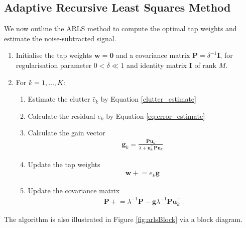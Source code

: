 \documentclass[pra,superscriptaddress,reprint,amsmath,amssymb,nofootinbib]{revtex4-2}
\begin{document}
\subsection{Adaptive Recursive Least Squares Method}
\label{sec:ARLS}
We now outline the ARLS method to compute the optimal tap weights and estimate the noise-subtracted signal. 
\begin{enumerate}
	\item Initialise the tap weights $\mathbf{w} = \mathbf{0}$ and a covariance matrix $\mathbf{P}= \delta^{-1} \mathbf{I}$, for regularisation parameter $0 < \delta \ll 1$  and identity matrix $\mathbf{I}$ of rank $M$.
	\item For $k=1, \dots, K$:
	
	\begin{enumerate}
		\item Estimate the clutter $\hat{c}_k$ by Equation \ref{clutter_estimate}
		\item Calculate the residual $e_k$ by Equation \ref{eq:error_estimate}
		\item Calculate the gain vector
		\begin{eqnarray}
			\mathbf{g}_k = \frac{\mathbf{P} \mathbf{u}_k}{\lambda + \mathbf{u}_k^{\intercal}\mathbf{P} \mathbf{u}_k}
		\end{eqnarray}
	\item Update the tap weights
			\begin{eqnarray}
		\mathbf{w} \mathrel{+}=  e_k \mathbf{g} 
	\end{eqnarray}
	\item Update the covariance matrix
\begin{eqnarray}
	\mathbf{P} \mathrel{+}= \lambda^{-1} \mathbf{P} - \mathbf{g} \lambda^{-1} \mathbf{P} \mathbf{u}_k^{\intercal} 
\end{eqnarray}

	\end{enumerate}

\end{enumerate}
The algorithm is also illustrated in Figure \ref{fig:arlsBlock} via a block diagram. \newline 
\end{document}
